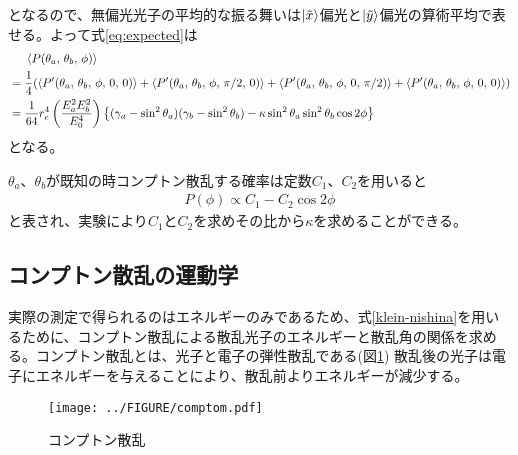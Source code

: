 \documentclass[../../main.tex]{subfiles}
\numberwithin{equation}{section}
\numberwithin{table}{section}
\numberwithin{figure}{section}
\begin{document}
となるので、無偏光光子の平均的な振る舞いは$\ket{\tilde{x}}$偏光と$\ket{\tilde{y}}$偏光の算術平均で表せる。よって式\eqref{eq:expected}は
\begin{align}
	&\phantom{==} \langle P (\theta_a,\, \theta_b,\, \phi) \rangle \notag \\
	&= \frac14 (\langle P' (\theta_a,\, \theta_b,\, \phi,\, 0,\, 0) \rangle + \langle P' (\theta_a,\, \theta_b,\, \phi,\, \pi/2,\, 0) \rangle + \langle P' (\theta_a,\, \theta_b,\, \phi,\, 0,\, \pi/2) \rangle + \langle P' (\theta_a,\, \theta_b,\, \phi,\, 0,\, 0) \rangle) \notag \\
	&= \frac{1}{64} r_e^4 \left( \frac{E_a^2 E_b^2}{E_0^4} \right) \bigl\{ (\gamma_a -\sin^2 \theta_a) (\gamma_b -\sin^2 \theta_b) -\kappa \sin^2 \theta_a \sin^2 \theta_b \cos 2\phi \bigr\}
\end{align}
となる。

$\theta_a$、$\theta_b$が既知の時コンプトン散乱する確率は定数$C_1$、$C_2$を用いると
\begin{align}
	P(\phi) \propto C_1 - C_2 \cos 2\phi\label{eq:theory_a-bcos}
\end{align}
と表され、実験により$C_1$と$C_2$を求めその比から$\kappa$を求めることができる。


\subsection{コンプトン散乱の運動学}\label{comptom_moment}
実際の測定で得られるのはエネルギーのみであるため、式\eqref{klein-nishina}を用いるために、コンプトン散乱による散乱光子のエネルギーと散乱角の関係を求める。コンプトン散乱とは、光子と電子の弾性散乱である(図\ref{fig:comptom}) 散乱後の光子は電子にエネルギーを与えることにより、散乱前よりエネルギーが減少する。

\begin{figure}[b!]
	\centering
	\texttt{[image: ../FIGURE/comptom.pdf]}
	\caption{コンプトン散乱}
	\label{fig:comptom}
\end{figure}


\end{document}

